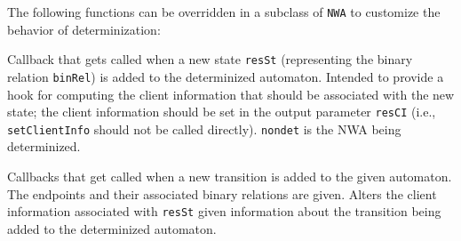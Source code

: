 The following functions can be overridden in a subclass of \texttt{NWA} to
customize the behavior of determinization:
\begin{functionlist}
  Callback that gets called when a new state \texttt{resSt} (representing the
  binary relation \texttt{binRel}) is added to the determinized automaton.
  Intended to provide a hook for computing the client information that should
  be associated with the new state; the client information should be set in
  the output parameter \texttt{resCI} (i.e., \texttt{setClientInfo} should not
  be called directly). \texttt{nondet} is the NWA being determinized.

    Callbacks that get called when a new transition is added to the given
    automaton. The endpoints and their associated binary relations are
    given.
    Alters the client information associated with \texttt{resSt} given
    information about the transition being added to the determinized
    automaton.
 \end{functionlist}

